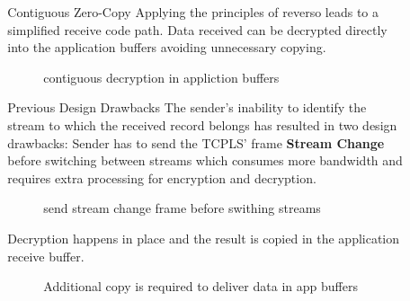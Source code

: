\documentclass[final]{beamer}
\newlength{\sepwidth}
\newlength{\colwidth}
\newcommand{\separatorcolumn}{\begin{column}{\sepwidth}\end{column}}
\begin{document}
\begin{frame}[t]
\begin{columns}[t]
\begin{column}{\colwidth}
        \begin{figure}
          \centering
          
          \label{fig:unamur}
        \end{figure}
        \begin{figure}
          \centering
          
          \label{fig:cyberwal}
        \end{figure}

      \end{column}

      \separatorcolumn

      \begin{column}{\colwidth}

        \begin{block}{Contiguous Zero-Copy}
          Applying the principles of reverso leads to a simplified receive code path.
          Data received can be decrypted directly into the application buffers avoiding unnecessary copying.
          \begin{figure}
            \centering
            
            \caption{contiguous decryption in appliction buffers}
            \label{fig:zero-copy}
          \end{figure}
        \end{block}

        \begin{block}{Previous Design Drawbacks}
          The sender's inability to identify the stream to which the received record belongs has resulted in two design drawbacks:
          Sender has to send the TCPLS' frame \textbf{Stream Change} before switching between streams which consumes
          more bandwidth and requires extra processing for encryption and decryption.
          \begin{figure}
            \centering
            
            \caption{send stream change frame before swithing streams}
            \label{fig:schange}
          \end{figure}
          Decryption happens in place and the result is copied in the application receive buffer.
          \begin{figure}
            \centering
            
            \caption{Additional copy is required to deliver data in app buffers}
            \label{fig:inplace}
          \end{figure}
        \end{block}



\end{column}
\end{columns}
\end{frame}
\end{document}
